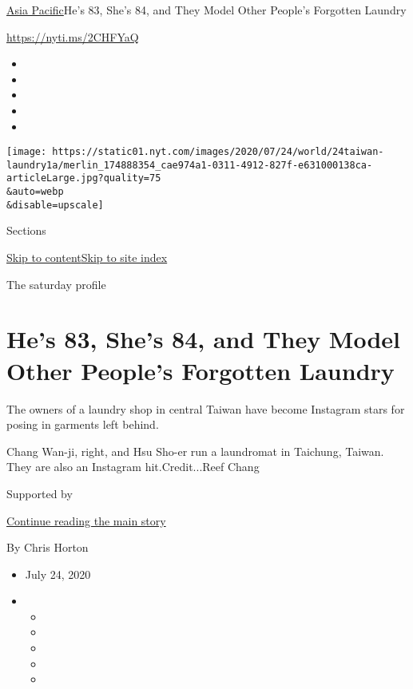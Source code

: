 \href{/section/world/asia}{Asia Pacific}\textbar{}He's 83, She's 84, and
They Model Other People's Forgotten Laundry

\url{https://nyti.ms/2CHFYaQ}

\begin{itemize}
\item
\item
\item
\item
\item
\end{itemize}

\texttt{[image: https://static01.nyt.com/images/2020/07/24/world/24taiwan-laundry1a/merlin\_174888354\_cae974a1-0311-4912-827f-e631000138ca-articleLarge.jpg?quality=75\\\&auto=webp\\\&disable=upscale]}

Sections

\protect\hyperlink{site-content}{Skip to
content}\protect\hyperlink{site-index}{Skip to site index}

The saturday profile

\hypertarget{hes-83-shes-84-and-they-model-other-peoples-forgotten-laundry}{%
\section{He's 83, She's 84, and They Model Other People's Forgotten
Laundry}\label{hes-83-shes-84-and-they-model-other-peoples-forgotten-laundry}}

The owners of a laundry shop in central Taiwan have become Instagram
stars for posing in garments left behind.

Chang Wan-ji, right, and Hsu Sho-er run a laundromat in Taichung,
Taiwan. They are also an Instagram hit.Credit...Reef Chang

Supported by

\protect\hyperlink{after-sponsor}{Continue reading the main story}

By Chris Horton

\begin{itemize}
\item
  July 24, 2020
\item
  \begin{itemize}
  \item
  \item
  \item
  \item
  \item
  \end{itemize}
\end{itemize}

